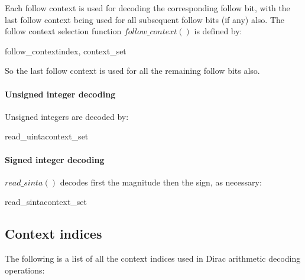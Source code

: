 Each follow context is used for decoding the corresponding follow bit, with the
last follow context being used for all subsequent follow bits (if any) also. 
The follow context selection function $follow\_context()$ is defined by:

\begin{pseudo}{follow\_context}{index, context\_set}
\end{pseudo}

So the last follow context is used for all the remaining follow bits also.

\paragraph{Unsigned integer decoding \\}

Unsigned integers are decoded by:

\begin{pseudo}{read\_uinta}{context\_set}
  \bsEND
\bsEND
{}
\end{pseudo}

\paragraph{Signed integer decoding \\}

$read\_sinta()$ decodes first the magnitude then the sign, as necessary:

\begin{pseudo}{read\_sinta}{context\_set}
  \bsEND
\bsEND
{}
\end{pseudo}

\subsection{Context indices}
\label{contextindices}

The following is a list of all the context indices used in Dirac arithmetic decoding operations:


